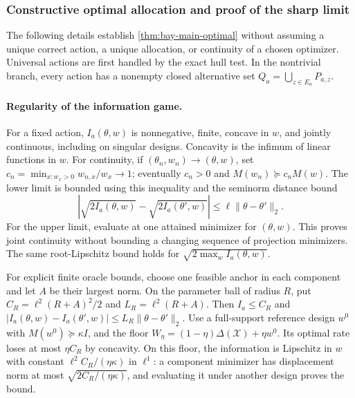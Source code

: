 \documentclass{article}
\theoremstyle{plain}
\theoremstyle{definition}
\begin{document}
\subsubsection{Constructive optimal allocation and proof of the sharp limit}

The following details establish \cref{thm:bay-main-optimal} without
assuming a unique correct action, a unique allocation, or continuity
of a chosen optimizer.  Universal actions are first handled by the exact
hull test.  In the nontrivial branch, every action has a nonempty closed
alternative set $Q_a=\bigcup_{z\in E_a}P_{a,z}$.

\paragraph{Regularity of the information game.}
For a fixed action, $I_a(\theta,w)$ is nonnegative, finite, concave in
$w$, and jointly continuous, including on singular designs.  Concavity
is the infimum of linear functions in $w$.  For continuity, if
$(\theta_n,w_n)\to(\theta,w)$, set
$c_n=\min_{x:w_x>0}w_{n,x}/w_x\to1$; eventually $c_n>0$ and
$M(w_n)\succeq c_nM(w)$.  The lower limit is bounded using this
inequality and the seminorm distance bound
\begin{equation}
 \left|\sqrt{2I_a(\theta,w)}-
        \sqrt{2I_a(\theta',w)}\right|
 \le\ell\|\theta-\theta'\|_2.
 \label{eq:bay-root-lipschitz}
\end{equation}
For the upper limit, evaluate at one attained minimizer for $(\theta,w)$.
This proves joint continuity without bounding a changing sequence of
projection minimizers.  The same root-Lipschitz bound holds for
$\sqrt{2\max_wI_a(\theta,w)}$.

For explicit finite oracle bounds, choose one feasible anchor in each
component and let $A$ be their largest norm.  On the parameter ball of
radius $R$, put
$C_R=\ell^2(R+A)^2/2$ and $L_R=\ell^2(R+A)$.
Then $I_a\le C_R$ and
$|I_a(\theta,w)-I_a(\theta',w)|\le L_R\|\theta-\theta'\|_2$.
Use a full-support reference design $w^0$ with
$M(w^0)\succeq\kappa I$, and the floor
$W_\eta=(1-\eta)\Delta(\mathcal X)+\eta w^0$.
Its optimal rate loses at most $\eta C_R$ by concavity.  On this floor,
the information is Lipschitz in $w$ with constant
$\ell^2 C_R/(\eta\kappa)$ in $\ell^1$: a component minimizer has
displacement norm at most $\sqrt{2C_R/(\eta\kappa)}$, and evaluating
it under another design proves the bound.
\end{document}
